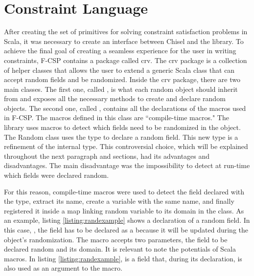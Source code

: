 \section{Constraint Language}\label{sec:csp:constraintlanguage}
After creating the set of primitives for solving constraint satisfaction
problems in Scala, it was necessary to create an interface between Chisel and
the library. To achieve the final goal of creating a seamless experience for the
user in writing constraints, F-CSP contains a package called crv. The crv
package is a collection of helper classes that allows the user to extend a
generic Scala class that can accept random fields and be randomized. Inside the
crv package, there are two main classes. The first one, called ,
is what each random object should inherit from and exposes all the necessary
methods to create and declare random objects. The second one, called
, contains all the declarations of the macros used in F-CSP.
The macros defined in this class are ``compile-time macros." The library uses
macros to detect which fields need to be randomized in the object. The Random
class uses the type  to declare a random field. This new type is
a refinement of the internal  type. This controversial choice,
which will be explained throughout the next paragraph and sections, had its
advantages and disadvantages. The main disadvantage was the impossibility to
detect at run-time which fields were declared random.

For this reason, compile-time macros were used to detect the field declared with
the  type, extract its name, create a variable with the same
name, and finally registered it inside a map linking random variable to its
domain in the  class. As an example, listing
\ref{listing:randexample} shows a declaration of a random field. In this case,
, the field has to be declared as a  because it will be
updated during the object's randomization. The  macro accepts two
parameters, the field to be declared random and its domain. It is relevant to
note the potentials of Scala macros. In listing \ref{listing:randexample},
 is a field that, during its declaration, is also used as an argument
to the  macro.


